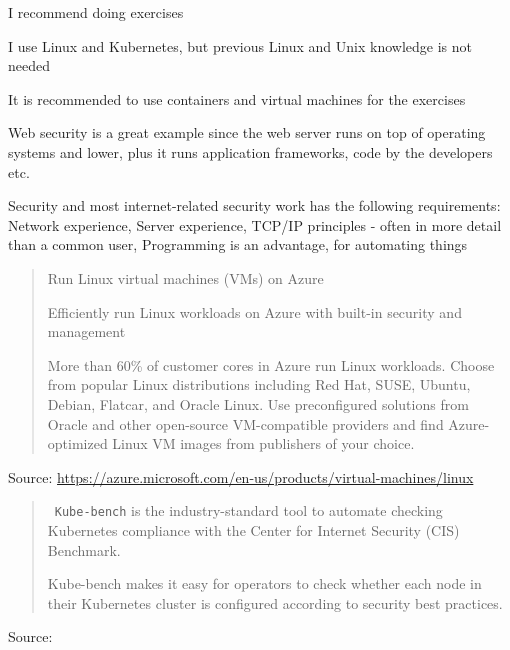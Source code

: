 \documentclass[Screen16to9,17pt]{foils}
\begin{document}
\begin{list2}
\item I recommend doing exercises
\item I use Linux and Kubernetes, but previous Linux and Unix knowledge is not needed
\item It is recommended to use containers and virtual machines for the exercises
\item Web security is a great example since the web server runs on top of operating systems and lower, plus it runs application frameworks, code by the developers etc.

\item Security and most internet-related security work has the following requirements:\\
Network experience, Server experience, TCP/IP principles - often in more detail than a common user, Programming is an advantage, for automating things
\end{list2}



\begin{quote}
{\large Run Linux virtual machines (VMs) on Azure}

Efficiently run Linux workloads on Azure with built-in security and management

More than 60\% of customer cores in Azure run Linux workloads. Choose from popular Linux distributions including Red Hat, SUSE, Ubuntu, Debian, Flatcar, and Oracle Linux. Use preconfigured solutions from Oracle and other open-source VM-compatible providers and find Azure-optimized Linux VM images from publishers of your choice.
\end{quote}
Source: \url{https://azure.microsoft.com/en-us/products/virtual-machines/linux}




\begin{quote}
\faWrench\ \verb+Kube-bench+ is the industry-standard tool to automate checking Kubernetes compliance with the Center for Internet Security (CIS) Benchmark.

Kube-bench makes it easy for operators to check whether each node in their Kubernetes cluster is configured according to security best practices.
\end{quote}
Source: 
\end{document}
